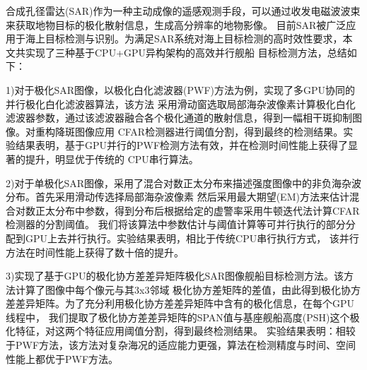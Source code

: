 \begin{cabstract}
  合成孔径雷达(SAR)作为一种主动成像的遥感观测手段，可以通过收发电磁波波束来获取地物目标的极化散射信息，生成高分辨率的地物影像。
  目前SAR被广泛应用于海上目标检测与识别。为满足SAR系统对海上目标检测的高时效性要求，本文共实现了三种基于CPU+GPU异构架构的高效并行舰船
  目标检测方法，总结如下：

  1)对于极化SAR图像，以极化白化滤波器(PWF)方法为例，实现了多GPU协同的并行极化白化滤波器算法，该方法
  采用滑动窗选取局部海杂波像素计算极化白化滤波器参数，通过该滤波器融合各个极化通道的散射信息，得到一幅相干斑抑制图像。对重构降斑图像应用
  CFAR检测器进行阈值分割，得到最终的检测结果。实验结果表明，基于GPU并行的PWF检测方法有效，并在检测时间性能上获得了显著的提升，明显优于传统的
  CPU串行算法。

  2)对于单极化SAR图像，采用了混合对数正太分布来描述强度图像中的非负海杂波分布。首先采用滑动传选择局部海杂波像素
  然后采用最大期望(EM)方法来估计混合对数正太分布中参数，得到分布后根据给定的虚警率采用牛顿迭代法计算CFAR检测器的分割阈值。
  我们将该算法中参数估计与阈值计算等可并行执行的部分分配到GPU上去并行执行。实验结果表明，相比于传统CPU串行执行方式，
  该并行方法在时间性能上获得了数十倍的提升。

  3)实现了基于GPU的极化协方差差异矩阵极化SAR图像舰船目标检测方法。该方法计算了图像中每个像元与其3x3邻域
  极化协方差矩阵的差值，由此得到极化协方差差异矩阵。为了充分利用极化协方差差异矩阵中含有的极化信息，在每个GPU线程中，
  我们提取了极化协方差差异矩阵的SPAN值与基座舰船高度(PSH)这个极化特征，对这两个特征应用阈值分割，得到最终检测结果。
  实验结果表明：相较于PWF方法，该方法对复杂海况的适应能力更强，算法在检测精度与时间、空间性能上都优于PWF方法。

\end{cabstract}


